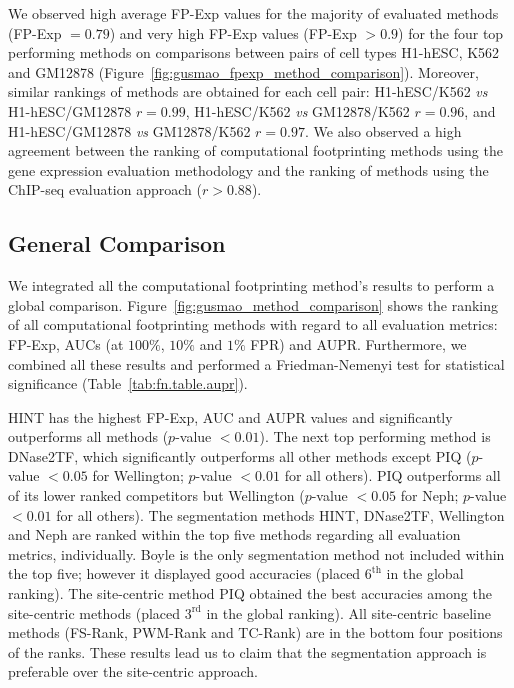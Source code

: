 We observed high average FP-Exp values for the majority of evaluated methods (FP-Exp $ = 0.79$) and very high FP-Exp values (FP-Exp $ > 0.9$) for the four top performing methods on comparisons between pairs of cell types H1-hESC, K562 and GM12878 (Figure~\ref{fig:gusmao_fpexp_method_comparison}). Moreover, similar rankings of methods are obtained for each cell pair: H1-hESC/K562 \textit{vs} H1-hESC/GM12878 $r = 0.99$, H1-hESC/K562 \textit{vs} GM12878/K562 $r = 0.96$, and H1-hESC/GM12878 \textit{vs} GM12878/K562 $r = 0.97$. We also observed a high agreement between the ranking of computational footprinting methods using the gene expression evaluation methodology and the ranking of methods using the ChIP-seq evaluation approach ($r > 0.88$).

\subsection{General Comparison}
\label{sec:integrated.comparison}

We integrated all the computational footprinting method's results to perform a global comparison. Figure~\ref{fig:gusmao_method_comparison} shows the ranking of all computational footprinting methods with regard to all evaluation metrics: FP-Exp, AUCs (at $100\%$, $10\%$ and $1\%$ FPR) and AUPR. Furthermore, we combined all these results and performed a Friedman-Nemenyi test for statistical significance (Table~\ref{tab:fn.table.aupr}).

HINT has the highest FP-Exp, AUC and AUPR values and significantly outperforms all methods ($p$-value $< 0.01$). The next top performing method is DNase2TF, which significantly outperforms all other methods except PIQ ($p$-value $< 0.05$ for Wellington; $p$-value $< 0.01$ for all others). PIQ outperforms all of its lower ranked competitors but Wellington ($p$-value $< 0.05$ for Neph; $p$-value $< 0.01$ for all others). The segmentation methods HINT, DNase2TF, Wellington and Neph are ranked within the top five methods regarding all evaluation metrics, individually. Boyle is the only segmentation method not included within the top five; however it displayed good accuracies (placed $6^{\text{th}}$ in the global ranking). The site-centric method PIQ obtained the best accuracies among the site-centric methods (placed $3^{\text{rd}}$ in the global ranking). All site-centric baseline methods (FS-Rank, PWM-Rank and TC-Rank) are in the bottom four positions of the ranks. These results lead us to claim that the segmentation approach is preferable over the site-centric approach.

